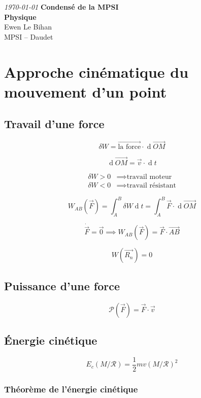 \documentclass{article}
\renewcommand{\d}{\operatorname{d}}
\renewcommand{\vec}{\overrightarrow}
\begin{document}
\begin{titlepage}
	\begin{center}
		\textit{\today}
		\vfill
		\textbf{\LARGE{Condensé de la MPSI}\\\Large{Physique}}\\
		\vfill
		\large{Ewen Le Bihan\\MPSI -- Daudet}
	\end{center}
\end{titlepage}

\newpage
\tableofcontents
\newpage


\section{Approche cinématique du mouvement d'un point}
\subsection{Travail d'une force}
\[
	\delta W = \vec{\text{la force}} \cdot \d\vec{OM}
\] 

\[
	\d\vec{OM} = \vec v  \cdot \d t
\] 

\begin{align*}
	\delta W > 0 &\implies \text{travail moteur} \\
	\delta W < 0 &\implies \text{travail résistant}
\end{align*}

\[
	W_{AB}(\vec F) = \int_A^B \delta W \d t = \int_A^B \vec F \cdot \d\vec{OM}
\] 

\[
	\dot{\vec{F}} = \vec 0 \implies W_{AB}(\vec F) = \vec F \cdot \vec{AB}
\] 

\[
	W(\vec{R_n}) = 0
\]

\subsection{Puissance d'une force}

\[
	\mathcal{P}(\vec F) = \vec F  \cdot  \vec v 
\] 
\subsection{Énergie cinétique}
\[
	E_c(M/\mathcal{R}) = \frac{1}{2}mv(M/\mathcal{R})^2
\] 

\subsubsection{Théorème de l'énergie cinétique}
\end{document}
